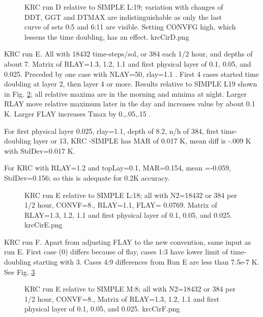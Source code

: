 \documentclass{article}
\begin{document}
\begin{figure}[!ht] 
\caption[KRC flay=.1 tests]{KRC run D relative to SIMPLE L:19; variation with changes of DDT, GGT and DTMAX are indistinguishable as only the last curve of sets 0:5 and 6:11 are visible. Setting CONVFG high, which lessens the time doubling, has an effect.
\label{krcCirD} krcCirD.png }
\end{figure} 

\clearpage

KRC run E.  All with 18432 time-steps/sol, or 384 each 1/2 hour, and depths of
about 7. Matrix of RLAY=1.3, 1.2, 1.1 and first physical layer of 0.1, 0.05, and
0.025.  Preceded by one case with NLAY=50, rlay=1.1 . First 4 cases started
time doubling at layer 2, then layer 4 or more. Results relative to SIMPLE L19
shown in Fig. \ref{krcCirE}; all relative maxima are in the morning and
minima at night.  Larger RLAY move relative maximum later in the day and
increases value by about 0.1 K. Larger FLAY increases Tmax by 0.,.05,.15 .

For first physical layer 0.025, rlay=1.1, depth of 8.2, n/h of 384, first
time-doubling layer or 13, KRC -SIMPLE has MAR of 0.017 K, mean diff is -.009 K
with StdDev=0.017 K.

For KRC with RLAY=1.2 and topLay=0.1, MAR=0.154, mean =-0.059, StdDev=0.156; so
this is adequate for 0.2K accuracy.

\begin{figure}[!ht] 
\caption[KRC flay=.1 tests]{KRC run E relative to SIMPLE L:18; all with N2=18432 or 384 per 1/2 hour, CONVF=8., RLAY=1.1, FLAY= 0.0769. Matrix of RLAY=1.3, 1.2, 1.1 and first physical layer of 0.1, 0.05, and 0.025. 
\label{krcCirE} krcCirE.png }
\end{figure} 

KRC run F. Apart from adjusting FLAY to the new convention, same input as run E.  First case (0) differs because of flay, cases 1:3  have lower limit of time-doubling starting with 3.  
Cases 4:9 differences from Run E are less than 7.5e-7 K. See Fig. \ref{krcCirF}

\begin{figure}[!ht] 
\caption[KRC flay/RLAY tests]{KRC run E relative to SIMPLE M:8; all with N2=18432 or 384 per 1/2 hour, CONVF=8., Matrix of RLAY=1.3, 1.2, 1.1 and first physical layer of 0.1, 0.05, and 0.025. 
\label{krcCirF} krcCirF.png }
\end{figure} 
\end{document}
